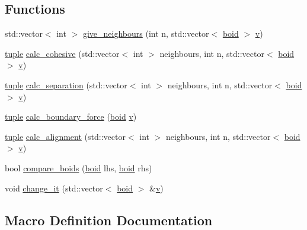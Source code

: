 \subsection*{Functions}
\begin{DoxyCompactItemize}
\item 
std\+::vector$<$ int $>$ \hyperlink{_parametric_2_starling-_simulation_2src_2properties_8cpp_a8a274a3ed40ef9c3fb2eea8f2f2f8358}{give\+\_\+neighbours} (int n, std\+::vector$<$ \hyperlink{classboid}{boid} $>$ \hyperlink{src_2main_8cpp_a1d5a718f1d6b42141bc3a6834be5e420}{v})
\item 
\hyperlink{classtuple}{tuple} \hyperlink{_parametric_2_starling-_simulation_2src_2properties_8cpp_afa110bb08efe1a435060b69cc946076c}{calc\+\_\+cohesive} (std\+::vector$<$ int $>$ neighbours, int n, std\+::vector$<$ \hyperlink{classboid}{boid} $>$ \hyperlink{src_2main_8cpp_a1d5a718f1d6b42141bc3a6834be5e420}{v})
\item 
\hyperlink{classtuple}{tuple} \hyperlink{_parametric_2_starling-_simulation_2src_2properties_8cpp_a50ac6a9e8234630a5ed0b55158cd2e5e}{calc\+\_\+separation} (std\+::vector$<$ int $>$ neighbours, int n, std\+::vector$<$ \hyperlink{classboid}{boid} $>$ \hyperlink{src_2main_8cpp_a1d5a718f1d6b42141bc3a6834be5e420}{v})
\item 
\hyperlink{classtuple}{tuple} \hyperlink{_parametric_2_starling-_simulation_2src_2properties_8cpp_abee90e2e93e750da724975805408daf0}{calc\+\_\+boundary\+\_\+force} (\hyperlink{classboid}{boid} \hyperlink{src_2main_8cpp_a1d5a718f1d6b42141bc3a6834be5e420}{v})
\item 
\hyperlink{classtuple}{tuple} \hyperlink{_parametric_2_starling-_simulation_2src_2properties_8cpp_a3df27269938df0adf292262c2ea8284d}{calc\+\_\+alignment} (std\+::vector$<$ int $>$ neighbours, int n, std\+::vector$<$ \hyperlink{classboid}{boid} $>$ \hyperlink{src_2main_8cpp_a1d5a718f1d6b42141bc3a6834be5e420}{v})
\item 
bool \hyperlink{_parametric_2_starling-_simulation_2src_2properties_8cpp_a7710f08e0d0c5ec292c8527e64d91813}{compare\+\_\+boids} (\hyperlink{classboid}{boid} lhs, \hyperlink{classboid}{boid} rhs)
\item 
void \hyperlink{_parametric_2_starling-_simulation_2src_2properties_8cpp_a0997f2a51d68a3d4a7d8ae247af76cab}{change\+\_\+it} (std\+::vector$<$ \hyperlink{classboid}{boid} $>$ \&\hyperlink{src_2main_8cpp_a1d5a718f1d6b42141bc3a6834be5e420}{v})
\end{DoxyCompactItemize}


\subsection{Macro Definition Documentation}
